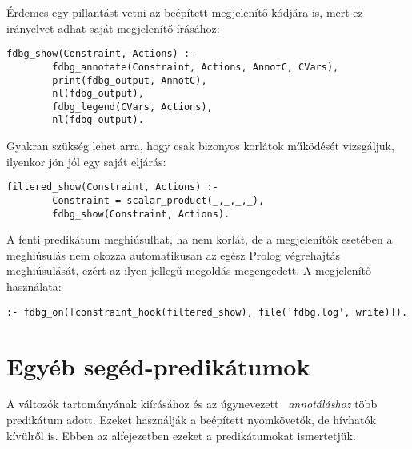 Érdemes egy pillantást vetni az  beépített megjelenítő kódjára is,
mert ez irányelvet adhat saját megjelenítő írásához:

\begin{verbatim}
fdbg_show(Constraint, Actions) :-
        fdbg_annotate(Constraint, Actions, AnnotC, CVars),
        print(fdbg_output, AnnotC),
        nl(fdbg_output),
        fdbg_legend(CVars, Actions),
        nl(fdbg_output).
\end{verbatim}

Gyakran szükség lehet arra, hogy csak bizonyos korlátok működését vizsgáljuk,
ilyenkor jön jól egy saját  eljárás:

\begin{verbatim}
filtered_show(Constraint, Actions) :-
        Constraint = scalar_product(_,_,_,_),
        fdbg_show(Constraint, Actions).
\end{verbatim}

A fenti predikátum meghiúsulhat, ha  nem  korlát,
de a megjelenítők esetében a meghiúsulás nem okozza automatikusan az egész Prolog
végrehajtás meghiúsulását, ezért az ilyen jellegű megoldás megengedett. A
megjelenítő használata:

\begin{verbatim}
:- fdbg_on([constraint_hook(filtered_show), file('fdbg.log', write)]).
\end{verbatim}

\section{Egyéb segéd-predikátumok}

A változók tartományának kiírásához és az úgynevezett ~\emph{annotáláshoz} több
predikátum adott.  Ezeket használják a beépített nyomkövetők, de hívhatók
kívülről is. Ebben az alfejezetben ezeket a predikátumokat ismertetjük.

